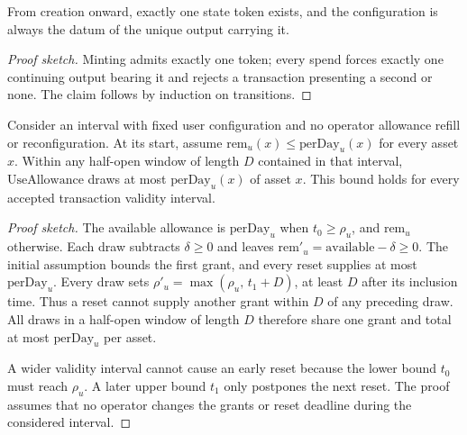 \documentclass[11pt,DIV=11,parskip=half-]{scrartcl}
\begin{document}
\begin{theorem}
From creation onward, exactly one state token exists, and the configuration is always the datum of the unique output carrying it.
\end{theorem}
\begin{proof}[Proof sketch]
Minting admits exactly one token; every spend forces exactly one continuing output bearing it and rejects a transaction presenting a second or none. The claim follows by induction on transitions.
\end{proof}

\begin{theorem}
\label{thm:allowance-velocity}
Consider an interval with fixed user configuration and no operator allowance refill or reconfiguration.
At its start, assume $\mathrm{rem}_u(x) \le \mathrm{perDay}_u(x)$ for every asset $x$.
Within any half-open window of length $D$ contained in that interval, $\mathrm{UseAllowance}$ draws at most $\mathrm{perDay}_u(x)$ of asset $x$.
This bound holds for every accepted transaction validity interval.
\end{theorem}
\begin{proof}[Proof sketch]
The available allowance is $\mathrm{perDay}_u$ when $t_0 \ge \rho_u$, and $\mathrm{rem}_u$ otherwise.
Each draw subtracts $\delta \ge 0$ and leaves $\mathrm{rem}'_u = \mathrm{available} - \delta \ge 0$.
The initial assumption bounds the first grant, and every reset supplies at most $\mathrm{perDay}_u$.
Every draw sets $\rho'_u = \max(\rho_u,\, t_1 + D)$, at least $D$ after its inclusion time.
Thus a reset cannot supply another grant within $D$ of any preceding draw.
All draws in a half-open window of length $D$ therefore share one grant and total at most $\mathrm{perDay}_u$ per asset.

A wider validity interval cannot cause an early reset because the lower bound $t_0$ must reach $\rho_u$.
A later upper bound $t_1$ only postpones the next reset.
The proof assumes that no operator changes the grants or reset deadline during the considered interval.
\end{proof}
\end{document}
